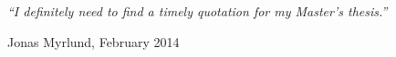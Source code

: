 \documentclass[11pt, a4paper, oneside]{Thesis} %
\begin{document}


%
%
%
%
%
%   
%


\pagestyle{empty} %

\null\vfill %

\textit{\Large{``I definitely need to find a timely quotation for my Master's thesis.''}}

\begin{flushright}
Jonas Myrlund, February 2014
\end{flushright}

\vfill\vfill\vfill\vfill\vfill\vfill\null %

\clearpage %


\end{document}
